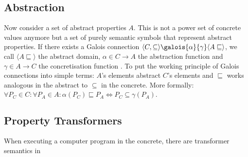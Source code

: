 \subsection{Abstraction}\label{sec:abstractinterpretation:abstraction}

Now consider a set of abstract properties $A$. This is not a power set of concrete values anymore but a set of purely semantic symbols that represent abstract properties. If there exists a Galois connection $\langle C,\subseteq\rangle \galois{\alpha}{\gamma}\langle A\sqsubseteq\rangle$, we call $\langle A\sqsubseteq\rangle$ the abstract domain, $\alpha\in C\to A$ the abstraction function and $\gamma\in A\to C$ the concretisation function \cite[chapter 11]{cousot2021}. To put the working principle of Galois connections into simple terms: $A$'s elements abstract $C$'s elements and $\sqsubseteq$ works analogous in the abstract to $\subseteq$ in the concrete. More formally: $\forall P_C\in C:\forall P_A \in A:\alpha(P_C)\sqsubseteq P_A \Longleftrightarrow P_C \subseteq \gamma(P_A)$.



\subsection{Property Transformers}

When executing a computer program in the concrete, there are transformer semantics in






